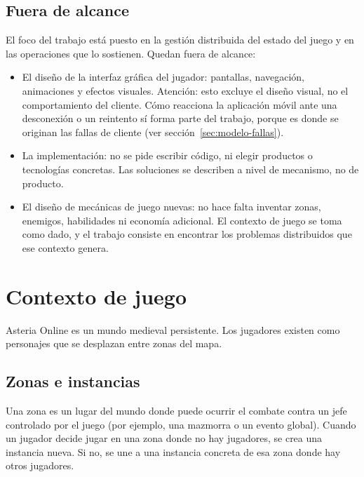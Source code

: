 \documentclass[variant=guia,cover=institutional,mode=screen]{ua-engineering-v6-article}
\begin{document}
    \subsection{Fuera de alcance}\label{subsec:fuera-de-alcance}

    El foco del trabajo está puesto en la gestión distribuida del estado del juego y en las operaciones que lo sostienen.
    Quedan fuera de alcance:

    \begin{itemize}
        \item El diseño de la interfaz gráfica del jugador: pantallas, navegación, animaciones y efectos visuales.
        Atención: esto excluye el diseño visual, no el comportamiento del cliente.
        Cómo reacciona la aplicación móvil ante una desconexión o un reintento sí forma parte del trabajo, porque es donde se originan las fallas de cliente (ver sección~\ref{sec:modelo-fallas}).
        \item La implementación: no se pide escribir código, ni elegir productos o tecnologías concretas.
        Las soluciones se describen a nivel de mecanismo, no de producto.
        \item El diseño de mecánicas de juego nuevas: no hace falta inventar zonas, enemigos, habilidades ni economía adicional.
        El contexto de juego se toma como dado, y el trabajo consiste en encontrar los problemas distribuidos que ese contexto genera.
    \end{itemize}

    \section{Contexto de juego}\label{sec:contexto-juego}

    Asteria Online es un mundo medieval persistente.
    Los jugadores existen como personajes que se desplazan entre zonas del mapa.

    \subsection{Zonas e instancias}\label{subsec:zonas-instancias}

    Una zona es un lugar del mundo donde puede ocurrir el combate contra un jefe controlado por el juego (por ejemplo, una mazmorra o un evento global).
    Cuando un jugador decide jugar en una zona donde no hay jugadores, se crea una instancia nueva.
    Si no, se une a una instancia concreta de esa zona donde hay otros jugadores.
\end{document}
